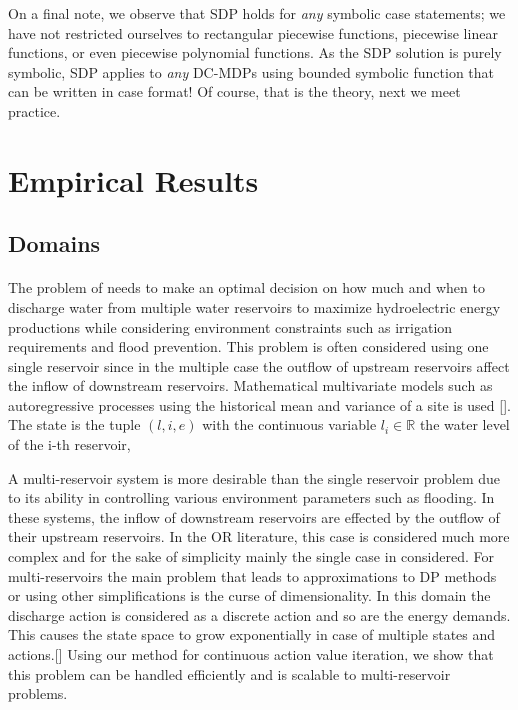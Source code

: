 \documentclass[letterpaper]{article}
\renewcommand{\-}{\text{-}}
\begin{document}

On a final note, we observe that SDP holds for \emph{any} symbolic
case statements; we have not restricted ourselves to rectangular
piecewise functions, piecewise linear functions, or even piecewise
polynomial functions.  As the SDP solution is purely symbolic,
SDP applies to \emph{any} DC-MDPs using bounded symbolic function 
that can be written in case format!  Of course, that is the theory,
next we meet practice.




\section{Empirical Results}



\subsection{Domains}

\paragraph{\WaterReservoir}The problem of \WaterReservoir needs to make an optimal decision on how much and when to discharge water from multiple water reservoirs to maximize hydroelectric energy productions while considering environment constraints such as irrigation requirements and flood prevention. This problem is often considered using 
one single reservoir since in the multiple case the outflow of upstream reservoirs affect the inflow of downstream reservoirs. Mathematical multivariate models such as autoregressive  processes using the historical mean and variance of a site is used []. 
The state is the tuple $(l,i,e)$ with the continuous variable $l_i \in\mathbb{R}$ the water level of the i-th reservoir,

A multi-reservoir system is more desirable than the single reservoir problem due to its ability in controlling various environment parameters such as flooding. 
In these systems, the inflow of downstream reservoirs are effected by the outflow of their upstream reservoirs. In the OR literature, this case 
is considered much more complex and for the sake of simplicity mainly the single case in considered. For multi-reservoirs the main problem that leads to 
approximations to DP methods or using other simplifications is the curse of dimensionality. In this domain the discharge action is considered as a discrete action 
and so are the energy demands. This causes the state space to grow exponentially in case of multiple states and actions.[]
Using our method for continuous action value iteration, we show that this problem can be handled efficiently and is scalable to multi-reservoir problems. 
\end{document}
